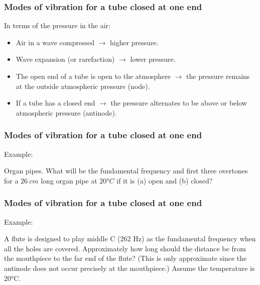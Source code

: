 \documentclass[]{beamer}
\begin{document}
\begin{frame}
\frametitle{Modes of vibration for a tube closed at one end}

In terms of the pressure in the air:
\vspace{3mm}

\begin{itemize}

\item Air in a wave compressed $\rightarrow$ higher pressure.
\pause

\item Wave expansion (or rarefaction) $\rightarrow$ lower pressure.
\pause

\item The open end of a tube is open to the atmosphere $\rightarrow$ the pressure  remains at the outside atmospheric pressure (node).
\pause

\item  If a tube has a closed end  $\rightarrow$  the pressure  alternates to be above or below atmospheric pressure (antinode). 
\end{itemize}





  \end{frame}











\begin{frame}
\frametitle{Modes of vibration for a tube closed at one end}

Example:
\vspace{3mm}

Organ pipes. What will be the fundamental frequency and first
three overtones for a $26~cm$ long organ pipe at $20°C$  if it is (a) open and (b) closed?

  \end{frame}


\begin{frame}

\frametitle{Modes of vibration for a tube closed at one end}

Example:
\vspace{3mm}

A flute is designed to play middle C (262 Hz) as the
fundamental frequency when all the holes are covered. Approximately how long
should the distance be from the mouthpiece to the far end of the flute? (This is
only approximate since the antinode does not occur precisely at the mouthpiece.)
Assume the temperature is 20°C.

  \end{frame}
\end{document}
